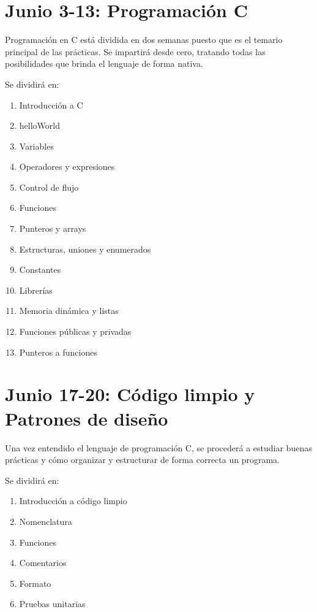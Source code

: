 \section*{Junio 3-13: Programación C}
\label{sec:jun3-13}

Programación en C está dividida en dos semanas puesto que es el temario principal de las prácticas.
Se impartirá desde cero, tratando todas las posibilidades que brinda el lenguaje de forma nativa.

Se dividirá en:

\begin{enumerate}
    \item Introducción a C
    \item helloWorld
    \item Variables
    \item Operadores y expresiones
    \item Control de flujo
    \item Funciones
    \item Punteros y arrays
    \item Estructuras, uniones y enumerados
    \item Constantes
    \item Librerías
    \item Memoria dinámica y listas
    \item Funciones públicas y privadas
    \item Punteros a funciones
\end{enumerate}


\section*{Junio 17-20: Código limpio y Patrones de diseño}
\label{sec:jun17-20}

Una vez entendido el lenguaje de programación C, se procederá a estudiar buenas prácticas y cómo organizar y estructurar de forma correcta un programa.

Se dividirá en:

\begin{enumerate}
    \item Introducción a código limpio
    \item Nomenclatura
    \item Funciones
    \item Comentarios
    \item Formato
    \item Pruebas unitarias
\end{enumerate}

